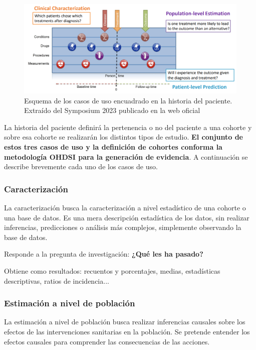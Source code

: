 \begin{figure}[H]
\centering
\includegraphics[width=1\textwidth]{figures/useCasesJourney.png}
     \caption{Esquema de los casos de uso encuadrado en la historia del paciente. Extraído del Symposium 2023 publicado en la web oficial \cite{OHDSIwebsite}}
    \label{fig:useCasesJourney}
\end{figure}

La historia del paciente definirá la pertenencia o no del paciente a una cohorte y sobre esa cohorte se realizarán los distintos tipos de estudio. \textbf{El conjunto de estos tres casos de uso y la definición de cohortes conforma la metodología OHDSI para la generación de evidencia}. A continuación se describe brevemente cada uno de los casos de uso. 

\subsubsection{Caracterización}

La caracterización busca la caracterización a nivel estadístico de una cohorte o una base de datos. Es una mera descripción estadística de los datos, sin realizar inferencias, predicciones o análisis más complejos, simplemente observando la base de datos.

Responde a la pregunta de investigación: \textbf{¿Qué les ha pasado?}

Obtiene como resultados: recuentos y porcentajes, medias, estadísticas descriptivas, ratios de incidencia...

\subsubsection{Estimación a nivel de población}

La estimación a nivel de población busca realizar inferencias causales sobre los efectos de las intervenciones sanitarias en la población. Se pretende entender los efectos causales para comprender las consecuencias de las acciones.

